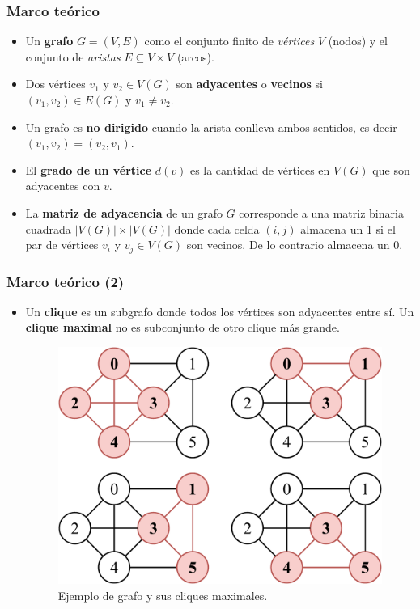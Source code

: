 \begin{frame}
\frametitle{Marco teórico}

\begin{itemize}
	\item Un \textbf{grafo} $G = (V, E)$ como el conjunto finito de \textit{vértices} $V$ (nodos) y el conjunto de \textit{aristas} $E \subseteq V \times V$ (arcos).
	\item Dos vértices $v_{1}$ y $v_{2} \in V(G)$ son \textbf{adyacentes} o \textbf{vecinos} si $(v_{1}, v_{2}) \in E(G)$ y $v_{1} \neq v_{2}$.
	\item Un grafo es \textbf{no dirigido} cuando la arista conlleva ambos sentidos, es decir $(v_{1}, v_{2}) = (v_{2}, v_{1})$.
	\item El \textbf{grado de un vértice} $d(v)$ es la cantidad de vértices en $V(G)$ que son adyacentes con $v$.
	\item La \textbf{matriz de adyacencia} de un grafo $G$ corresponde a una matriz binaria cuadrada $|V(G)| \times |V(G)|$ donde cada celda $(i,j)$ almacena un 1 si el par de vértices $v_{i}$ y $v_{j} \in V(G)$ son vecinos. De lo contrario almacena un 0.
\end{itemize}

\end{frame}



\begin{frame}
\frametitle{Marco teórico (2)}

\begin{itemize}
	\item Un \textbf{clique} es un subgrafo donde todos los vértices son adyacentes entre sí. Un \textbf{clique maximal} no es subconjunto de otro clique más grande.
	\begin{figure}
    		\centering
    		\includegraphics[width=0.4\linewidth]{../img/maxCliqueExample.pdf}
    	
    		\caption{Ejemplo de grafo y sus cliques maximales.}
    		\label{fig:maxCliqueExample}
	\end{figure}
\end{itemize}

\end{frame}


